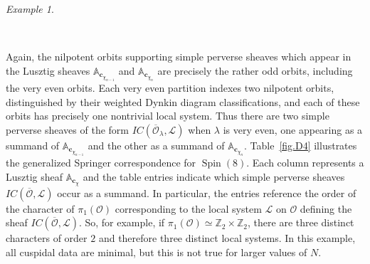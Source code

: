 \documentclass[reqno,11pt]{amsart}
\theoremstyle{remark}
\theoremstyle{remark}
\newtheorem{example}[Thm]{Example}
\theoremstyle{definition}
\theoremstyle{definition}
\theoremstyle{definition}
\numberwithin{equation}{section}
\newcommand{\Z}{\mathbb{ Z}}           %
\newcommand{\Spin}{\operatorname{Spin}}
\newcommand{\cl}{\mathcal{L}}
\newcommand{\co}{\mathcal{O}}
\begin{document}
\begin{example}
\begin{center}
\\
\end{center}
Again, the nilpotent orbits supporting simple perverse sheaves which appear in the Lusztig sheaves $\mathbb A_{\mathbf{c}_{\chi_{n-1}}}$ and $\mathbb A_{\mathbf{c}_{\chi_{n}}}$ are precisely the rather odd orbits,
including the very even orbits.   Each very even partition indexes two nilpotent orbits, distinguished by their weighted Dynkin diagram classifications, and each of these orbits has precisely one nontrivial local system. Thus there are two simple perverse sheaves of the form $IC(\overline{\co}_\lambda, \cl)$ when $\lambda$ is very even, one appearing as a summand of  $\mathbb A_{\mathbf{c}_{\chi_{n-1}}}$ and the other as a summand of $\mathbb A_{\mathbf{c}_{\chi_{n}}}$. Table~\ref{fig.D4} illustrates the generalized Springer correspondence for $\Spin(8)$.  Each column represents a Lusztig sheaf $\mathbb{A}_{\mathbf{c}_\chi}$ and the table entries indicate which simple perverse sheaves $IC(\overline{\co}, \cl)$ occur as a summand.
In particular, the entries reference the order of the character of $\pi_1(\co)$ corresponding to the local system $\cl$ on $\co$ defining the sheaf $IC(\overline{\co},\cl)$. So, for example, if $\pi_1(\co)\simeq  \Z_2\times \Z_2$, there are three distinct characters of order $2$ and therefore three distinct local systems.  In this example, all cuspidal data are minimal, but this is not true for larger values of $N$.  
\end{example}
\end{document}
